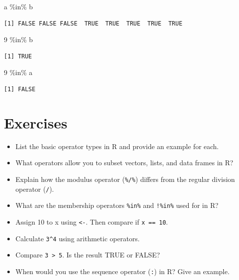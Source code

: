 \documentclass[
  letterpaper,
  DIV=11,
  numbers=noendperiod]{scrreprt}
\newenvironment{Shaded}{\begin{snugshade}}{\end{snugshade}}
\newcommand{\DecValTok}[1]{\textcolor[rgb]{0.68,0.00,0.00}{#1}}
\newcommand{\NormalTok}[1]{\textcolor[rgb]{0.00,0.23,0.31}{#1}}
\newcommand{\SpecialCharTok}[1]{\textcolor[rgb]{0.37,0.37,0.37}{#1}}
\begin{document}
\begin{Shaded}
\begin{Highlighting}[]
\NormalTok{a }\SpecialCharTok{\%in\%}\NormalTok{ b}
\end{Highlighting}
\end{Shaded}

\begin{verbatim}
[1] FALSE FALSE FALSE  TRUE  TRUE  TRUE  TRUE  TRUE
\end{verbatim}

\begin{Shaded}
\begin{Highlighting}[]
\DecValTok{9} \SpecialCharTok{\%in\%}\NormalTok{ b}
\end{Highlighting}
\end{Shaded}

\begin{verbatim}
[1] TRUE
\end{verbatim}

\begin{Shaded}
\begin{Highlighting}[]
\DecValTok{9} \SpecialCharTok{\%in\%}\NormalTok{ a}
\end{Highlighting}
\end{Shaded}

\begin{verbatim}
[1] FALSE
\end{verbatim}

\section{Exercises}\label{exercises-6}

\begin{itemize}
\item
  List the basic operator types in R and provide an example for each.
\item
  What operators allow you to subset vectors, lists, and data frames in
  R?
\item
  Explain how the modulus operator (\texttt{\%/\%}) differs from the
  regular division operator (\texttt{/}).
\item
  What are the membership operators \texttt{\%in\%} and \texttt{!\%in\%}
  used for in R?
\item
  Assign 10 to x using \texttt{\textless{}-}. Then compare if
  \texttt{x\ ==\ 10}.
\item
  Calculate \texttt{3\^{}4} using arithmetic operators.
\item
  Compare \texttt{3\ \textgreater{}\ 5}. Is the result TRUE or FALSE?
\item
  When would you use the sequence operator (\texttt{:}) in R? Give an
  example.
\end{itemize}
\end{document}
